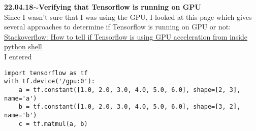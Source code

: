 \documentclass[11pt,a4paper]{article}
\newenvironment{loggentry}[2]%
{\noindent\textbf{#1}\hspace{1cm}$\mathbf{\sim}$\text{ }\textbf{#2}\\}{\vspace{0.5cm}}
\begin{document}
\begin{loggentry}{22.04.18}{Verifying that Tensorflow is running on GPU}
Since I wasn't sure that I was using the GPU, I looked at this page which gives several approaches to determine if Tensorflow is running on GPU or not:\\
\href{https://stackoverflow.com/questions/38009682/how-to-tell-if-tensorflow-is-using-gpu-acceleration-from-inside-python-shell}{Stackoverflow: How to tell if Tensorflow is using GPU acceleration from inside python shell}\\
I entered\\
\begin{verbatim}
import tensorflow as tf
with tf.device('/gpu:0'):
    a = tf.constant([1.0, 2.0, 3.0, 4.0, 5.0, 6.0], shape=[2, 3], name='a')
    b = tf.constant([1.0, 2.0, 3.0, 4.0, 5.0, 6.0], shape=[3, 2], name='b')
    c = tf.matmul(a, b)


\end{verbatim}
\end{loggentry}
\end{document}
